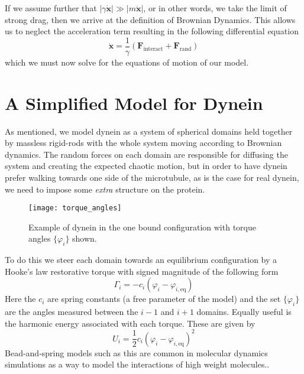 	If we assume further that $|\gamma\dot{\mathbf{x}}|\gg |m\ddot{\mathbf{x}}|$, or in other words, we take the limit of strong drag, then we arrive at the definition of Brownian Dynamics. This allows us to neglect the acceleration term resulting in the following differential equation
	\begin{equation}
		\dot{\mathbf{x}} = \frac{1}{\gamma}\left( \mathbf{F}_\text{interact} + \mathbf{F}_\text{rand} \right)
	\end{equation}
	which we must now solve for the equations of motion of our model. 
	
	
	\section{A Simplified Model for Dynein}
	As mentioned, we model dynein as a system of spherical domains held together by massless rigid-rods with the whole system moving according to Brownian dynamics. The random forces on each domain are responsible for diffusing the system and creating the expected chaotic motion, but in order to have dynein prefer walking towards one side of the microtubule, as is the case for real dynein, we need to impose some \textit{extra} structure on the protein. 
	
	\begin{figure}[hbt!]
		\centering
		\texttt{[image: torque\_angles]}
		\caption{Example of dynein in the one bound configuration with torque angles $\{\varphi_i\}$ shown.}
		\label{fig:torque angles}
	\end{figure}
	
	To do this we steer each domain towards an equilibrium configuration by a Hooke's law restorative torque with signed magnitude of the following form
	\begin{equation}
		\Gamma_i = -c_i\left(\varphi_i-\varphi_{i,\text{eq}}\right)
	\end{equation}
	Here the $c_i$ are spring constants (a free parameter of the model) and the set $\{\varphi_i\}$ are the angles measured between the $i-1$ and $i+1$ domains. Equally useful is the harmonic energy associated with each torque. These are given by
	\begin{equation}
		U_i = \frac{1}{2}c_i(\varphi_i-\varphi_{i,\text{eq}})^2
	\end{equation} 
	Bead-and-spring models such as this are common in molecular dynamics simulations as a way to model the interactions of high weight molecules.\cite{bead-spring-model}. 
	
